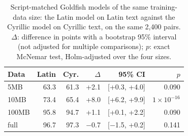 \begin{table}[t]
\centering\small
\setlength{\tabcolsep}{4pt}
\begin{tabular}{@{}lrrrrr@{}}
\toprule
Data & Latin & Cyr. & $\Delta$ & 95\% CI & $p$ \\
\midrule
5MB & 63.3 & 61.3 & +2.1 & [+0.3, +4.0] & 0.090 \\
10MB & 73.4 & 65.4 & +8.0 & [+6.2, +9.9] & $1\times10^{-16}$ \\
100MB & 95.8 & 94.7 & +1.1 & [+0.1, +2.2] & 0.090 \\
full & 96.7 & 97.3 & $-$0.7 & [$-$1.5, +0.2] & 0.141 \\
\bottomrule
\end{tabular}
\caption{Script-matched Goldfish models of the same training-data size: the Latin model on Latin text against the Cyrillic model on Cyrillic text, on the same 2,400 pairs. $\Delta$: difference in points with a bootstrap 95\% interval (not adjusted for multiple comparisons); $p$: exact McNemar test, Holm-adjusted over the four sizes.}
\label{tab:matched}
\end{table}
